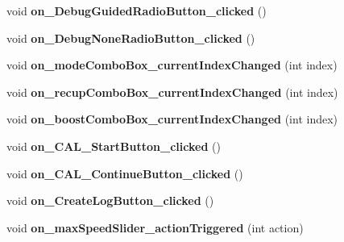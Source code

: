 \begin{DoxyCompactItemize}
\item 
\hypertarget{class_main_window_ad7d84560f6cf5ab723151ba7b239f237}{}void {\bfseries on\+\_\+\+Debug\+Guided\+Radio\+Button\+\_\+clicked} ()\label{class_main_window_ad7d84560f6cf5ab723151ba7b239f237}

\item 
\hypertarget{class_main_window_a7bf06b12acdc55f1a3077e075ddc1368}{}void {\bfseries on\+\_\+\+Debug\+None\+Radio\+Button\+\_\+clicked} ()\label{class_main_window_a7bf06b12acdc55f1a3077e075ddc1368}

\item 
\hypertarget{class_main_window_a2fd364f1604f4a82b6d184e2cfee0546}{}void {\bfseries on\+\_\+mode\+Combo\+Box\+\_\+current\+Index\+Changed} (int index)\label{class_main_window_a2fd364f1604f4a82b6d184e2cfee0546}

\item 
\hypertarget{class_main_window_aea9eea589a148ada379206476661b925}{}void {\bfseries on\+\_\+recup\+Combo\+Box\+\_\+current\+Index\+Changed} (int index)\label{class_main_window_aea9eea589a148ada379206476661b925}

\item 
\hypertarget{class_main_window_adc3aedfd4752bea231cfe467eb3543ff}{}void {\bfseries on\+\_\+boost\+Combo\+Box\+\_\+current\+Index\+Changed} (int index)\label{class_main_window_adc3aedfd4752bea231cfe467eb3543ff}

\item 
\hypertarget{class_main_window_a42075b4c9053cc3143e0bcafc1fea0ff}{}void {\bfseries on\+\_\+\+C\+A\+L\+\_\+\+Start\+Button\+\_\+clicked} ()\label{class_main_window_a42075b4c9053cc3143e0bcafc1fea0ff}

\item 
\hypertarget{class_main_window_ae5a5d073e5ef686fe22c50c49752da96}{}void {\bfseries on\+\_\+\+C\+A\+L\+\_\+\+Continue\+Button\+\_\+clicked} ()\label{class_main_window_ae5a5d073e5ef686fe22c50c49752da96}

\item 
\hypertarget{class_main_window_a251135c1f48fa30ac11aa85a039a7b0d}{}void {\bfseries on\+\_\+\+Create\+Log\+Button\+\_\+clicked} ()\label{class_main_window_a251135c1f48fa30ac11aa85a039a7b0d}

\item 
\hypertarget{class_main_window_ab2383fd202337a140d03dea789351376}{}void {\bfseries on\+\_\+max\+Speed\+Slider\+\_\+action\+Triggered} (int action)\label{class_main_window_ab2383fd202337a140d03dea789351376}


\end{DoxyCompactItemize}
